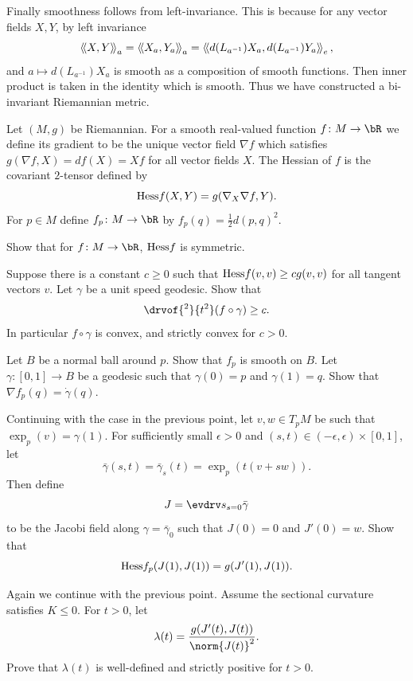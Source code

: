     Finally smoothness follows from left-invariance.
    This is because for any vector fields $X,Y$, by left invariance
    $$ \left<\!\left<X,Y\right>\!\right>_a = \left<\!\left<X_a,Y_a\right>\!\right>_a = \left<\!\left<d(L_{a^{-1}})X_a,d(L_{a^{-1}})Y_a\right>\!\right>_e , $$
    and $a\mapsto d(L_{a^{-1}})X_a$ is smooth as a composition of smooth functions.
    Then inner product is taken in the identity which is smooth.
    Thus we have constructed a bi-invariant Riemannian metric.
\eenum

\def\hess{{\rm Hess}}

\bprob

    Let $(M,g)$ be Riemannian.
    For a smooth real-valued function $f\colon M\to\bR$ we define its {\emphcolor gradient} to be the unique vector field
    $\nabla f$ which satisfies $g(\nabla f,X)=df(X)=Xf$ for all vector fields $X$.
    The {\emphcolor Hessian} of $f$ is the covariant $2$-tensor defined by
    $$ \hess f(X,Y) = g(\nabla_X\nabla f,Y) . $$
    For $p\in M$ define $f_p\colon M\to\bR$ by $f_p(q)=\frac12d(p,q)^2$.
    \benum
        \item Show that for $f\colon M\to\bR$, $\hess f$ is symmetric.
        \item Suppose there is a constant $c\geq0$ such that $\hess f(v,v)\geq cg(v,v)$ for all tangent vectors $v$.
        Let $\gamma$ be a unit speed geodesic.
        Show that
        $$ \drvof{^2}{t^2}(f\circ\gamma) \geq c . $$
        In particular $f\circ\gamma$ is convex, and strictly convex for $c>0$.
        \item Let $B$ be a normal ball around $p$.
        Show that $f_p$ is smooth on $B$.
        Let $\gamma\colon[0,1]\to B$ be a geodesic such that $\gamma(0)=p$ and $\gamma(1)=q$.
        Show that $\nabla f_p(q)=\dot\gamma(q)$.
        \item Continuing with the case in the previous point, let $v,w\in T_pM$ be such that $\exp_p(v)=\gamma(1)$.
        For sufficiently small $\epsilon>0$ and $(s,t)\in(-\epsilon,\epsilon)\times[0,1]$, let
        $$ \bar\gamma(s,t) = \bar\gamma_s(t) = \exp_p(t(v+sw)) . $$
        Then define
        $$ J = \evdrv s_{s=0}\bar\gamma $$
        to be the Jacobi field along $\gamma=\bar\gamma_0$ such that $J(0)=0$ and $J'(0)=w$.
        Show that
        $$ \hess f_p(J(1),J(1)) = g(J'(1),J(1)) . $$
        \item Again we continue with the previous point.
        Assume the sectional curvature satisfies $K\leq0$.
        For $t>0$, let
        $$ \lambda(t) = \frac{g(J'(t),J(t))}{\norm{J(t)}^2} . $$
        Prove that $\lambda(t)$ is well-defined and strictly positive for $t>0$.
